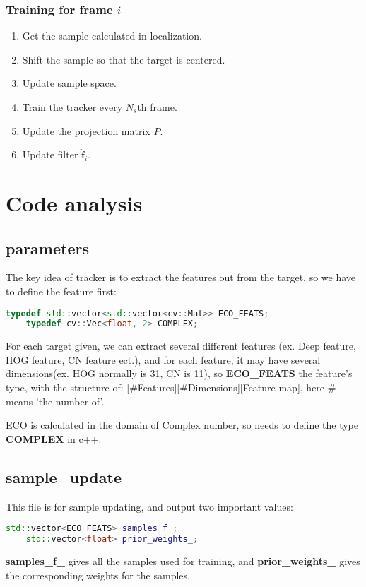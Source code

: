 \documentclass[12pt]{article}
\numberwithin{equation}{section}
\begin{document}
{\subsubsection{Training for frame $i$}
\begin{enumerate}
	\item Get the sample calculated in localization.
	\item Shift the sample so that the target is centered.
	\item Update sample space.
	\item Train the tracker every $N_s$th frame.
	\item Update the projection matrix $P$.
	\item Update filter  $\hat{\bm{f}}_{i}$.
\end{enumerate}
\section{Code analysis}
\subsection{parameters}
The key idea of tracker is to extract the features out from the target, so we have to define the feature first:
\begin{lstlisting}[language=C++]
	typedef std::vector<std::vector<cv::Mat>> ECO_FEATS;
	typedef cv::Vec<float, 2> COMPLEX;  
\end{lstlisting} \par
For each target given, we can extract several different features (ex. Deep feature, HOG feature, CN feature ect.), and for each feature, it may have several dimensions(ex. HOG normally is 31, CN is 11), so \textbf{ECO\_FEATS} the feature's type, with the structure of: [\#Features][\#Dimensions][Feature map], here \# means 'the number of'. \par
ECO is calculated in the domain of Complex number, so needs to define the type \textbf{COMPLEX} in c++. \par
\subsection{sample\_update}
This file is for sample updating, and output two important values:
\begin{lstlisting}[language=C++]
	std::vector<ECO_FEATS> samples_f_;
	std::vector<float> prior_weights_;
\end{lstlisting} \par
\textbf{samples\_f\_} gives all the samples used for training, and \textbf{prior\_weights\_} gives the corresponding weights for the samples. \par
}
\end{document}

